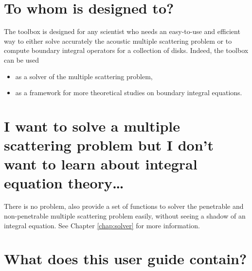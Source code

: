 \section*{To whom \mudiff is designed to?}

The toolbox \mudiff is designed for any  scientist who needs an easy-to-use and efficient way to either solve accurately the acoustic multiple scattering problem  or
 to compute boundary integral operators for a collection of disks. Indeed, the \mudiff toolbox can be used
\begin{itemize}
\item as a solver of the multiple scattering problem,%
\item as a framework for more theoretical studies on boundary integral equations.%
\end{itemize}


\section*{I want to solve a multiple scattering problem but I don't want to learn about integral equation theory\ldots}

There is no problem, \mudiff also provide a set of functions to solver the penetrable and non-penetrable multiple scattering problem easily, without seeing a shadow of an integral equation. See Chapter \ref{chap:solver} for more information.


\section*{What does this user guide contain?}

